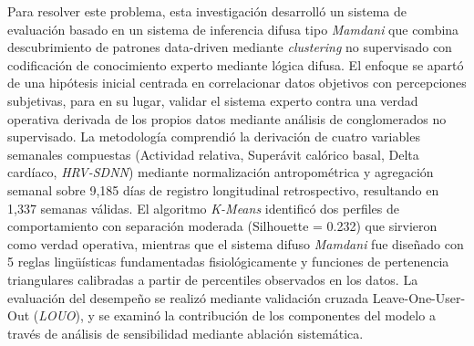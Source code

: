 Para resolver este problema, esta investigación desarrolló un sistema de evaluación basado en un sistema de inferencia difusa tipo \textit{Mamdani} que combina descubrimiento de patrones data-driven mediante \textit{clustering} no supervisado con codificación de conocimiento experto mediante lógica difusa. El enfoque se apartó de una hipótesis inicial centrada en correlacionar datos objetivos con percepciones subjetivas, para en su lugar, validar el sistema experto contra una verdad operativa derivada de los propios datos mediante análisis de conglomerados no supervisado. La metodología comprendió la derivación de cuatro variables semanales compuestas (Actividad relativa, Superávit calórico basal, Delta cardíaco, \textit{HRV-SDNN}) mediante normalización antropométrica y agregación semanal sobre 9,185 días de registro longitudinal retrospectivo, resultando en 1,337 semanas válidas. El algoritmo \textit{K-Means} identificó dos perfiles de comportamiento con separación moderada (Silhouette = 0.232) que sirvieron como verdad operativa, mientras que el sistema difuso \textit{Mamdani} fue diseñado con 5 reglas lingüísticas fundamentadas fisiológicamente y funciones de pertenencia triangulares calibradas a partir de percentiles observados en los datos. La evaluación del desempeño se realizó mediante validación cruzada Leave-One-User-Out (\textit{LOUO}), y se examinó la contribución de los componentes del modelo a través de análisis de sensibilidad mediante ablación sistemática.


